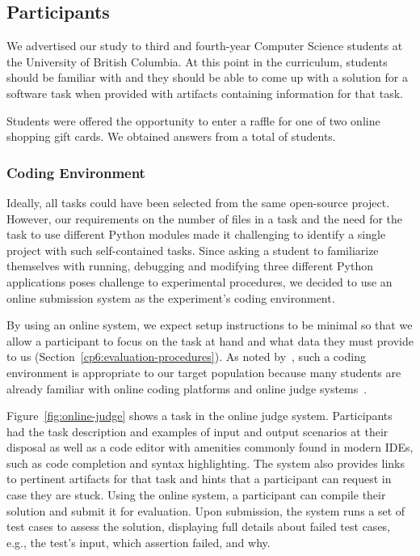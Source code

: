 {\subsection{Participants}



We advertised our study to third and fourth-year Computer Science students at the University of British Columbia. 
At this point in the curriculum, students should be familiar with  and they should be able to come up with a solution 
for a software task when provided with artifacts containing information for that task.


Students were offered the opportunity to enter a raffle for one of two  online shopping gift cards.
We obtained answers from a total of \red{\#} students. 




\subsubsection{Coding Environment}


Ideally, all tasks could have been selected from the same open-source project. However, our requirements on the number of files in a task and the need for the task to use different Python modules made it challenging to identify a single project with such self-contained tasks. Since asking a student to familiarize themselves with running, debugging and modifying three different Python applications 
poses challenge to experimental procedures, we decided to use 
an online submission system as the experiment's coding environment.



By using an online system, we expect setup instructions to be minimal 
so that we allow a participant to focus on the task at hand and what data they must provide to us (Section~\ref{cp6:evaluation-procedures}).
As noted by~, such a coding environment is appropriate to our target population 
because many students are already familiar with online coding platforms and online judge systems~. 


Figure~\ref{fig:online-judge} shows a task in the online judge system. 
Participants had the task description and examples of input and output scenarios at their disposal as well as a code editor with amenities commonly found in modern IDEs, such as code completion and syntax highlighting. The system also provides links to pertinent artifacts for that task and hints that a participant can request in case they are stuck.
Using the online system, a participant can compile their solution and submit it for evaluation.
Upon submission, the system runs a set of test cases to assess the solution, 
 displaying full details about failed test cases, e.g., the test's input, which assertion failed, and why. 


}
